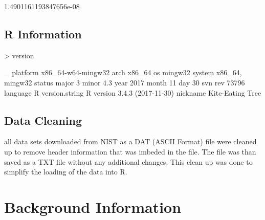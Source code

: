 \documentclass[10pt]{article}
\begin{document}
\begin{Schunk}
\begin{Soutput}
[1] 1.4901161193847656e-08
\end{Soutput}
\end{Schunk}
\subsection{R Information}
\begin{Schunk}
\begin{Sinput}
> version
\end{Sinput}
\begin{Soutput}
               _                           
platform       x86_64-w64-mingw32          
arch           x86_64                      
os             mingw32                     
system         x86_64, mingw32             
status                                     
major          3                           
minor          4.3                         
year           2017                        
month          11                          
day            30                          
svn rev        73796                       
language       R                           
version.string R version 3.4.3 (2017-11-30)
nickname       Kite-Eating Tree            
\end{Soutput}
\end{Schunk}
\subsection{Data Cleaning}
all data sets downloaded from NIST as a DAT (ASCII Format) file were cleaned up 
to remove header information that was imbeded in the file. The file was than saved
as a TXT file without any additional changes. This clean up was done to simplify 
the loading of the data into R.

\section{Background Information}
\end{document}
